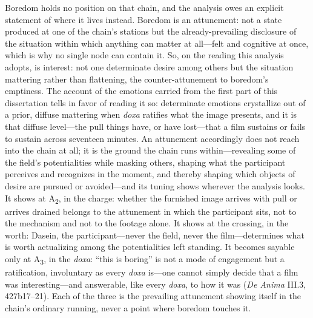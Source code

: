 Boredom holds no position on that chain, and the analysis owes an explicit statement of where
it lives instead. Boredom is an attunement: not a state produced at one of the chain's stations
but the already-prevailing disclosure of the situation within which anything can matter at
all---felt and cognitive at once, which is why no single node can contain it. So, on the
reading this analysis adopts, is interest: not one determinate desire among others but the
situation mattering rather than flattening, the counter-attunement to boredom's emptiness. The
account of the emotions carried from the first part of this dissertation tells in favor of
reading it so: determinate emotions crystallize out of a prior, diffuse mattering when
\textit{doxa} ratifies what the image presents, and it is that diffuse level---the pull things
have, or have lost---that a film sustains or fails to sustain across seventeen minutes. An
attunement accordingly does not reach into the chain at all; it is the ground the chain runs
within---revealing some of the field's potentialities while masking others, shaping what the
participant perceives and recognizes in the moment, and thereby shaping which objects of
desire are pursued or avoided---and its tuning shows wherever the analysis looks. It shows at
A\textsubscript{2}, in the charge: whether the furnished image arrives with pull or arrives
drained belongs to the attunement in which the participant sits, not to the mechanism and not
to the footage alone. It shows at the crossing, in the worth: Dasein, the participant---never
the field, never the film---determines what is worth actualizing among the potentialities left
standing. It becomes sayable only at A\textsubscript{3}, in the \textit{doxa}: ``this is
boring'' is not a mode of engagement but a ratification, involuntary as every \textit{doxa}
is---one cannot simply decide that a film was interesting---and answerable, like every
\textit{doxa}, to how it was (\textit{De Anima} III.3, 427b17--21). Each of the three is the
prevailing attunement showing itself in the chain's ordinary running, never a point where
boredom touches it.

